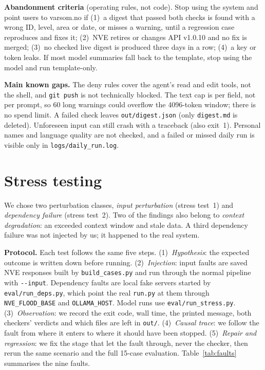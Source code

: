 \documentclass{article}
\newcommand{\code}[1]{\texttt{#1}}
\begin{document}
\textbf{Abandonment criteria} (operating rules, not code). Stop using the system and point users to varsom.no if (1)~a digest that passed both checks is found with a wrong ID, level, area or date, or misses a warning, until a regression case reproduces and fixes it; (2)~NVE retires or changes API v1.0.10 and no fix is merged; (3)~no checked live digest is produced three days in a row; (4)~a key or token leaks. If most model summaries fall back to the template, stop using the model and run template-only.

\textbf{Main known gaps.} The deny rules cover the agent's read and edit tools, not the shell, and \code{git push} is not technically blocked. The text cap is per field, not per prompt, so 60 long warnings could overflow the 4096-token window; there is no spend limit. A failed check leaves \code{out/digest.json} (only \code{digest.md} is deleted). Unforeseen input can still crash with a traceback (also exit~1). Personal names and language quality are not checked, and a failed or missed daily run is visible only in \code{logs/daily\_run.log}.

\section{Stress testing}
\label{sec:stress}
We chose two perturbation classes, \emph{input perturbation} (stress test~1) and \emph{dependency failure} (stress test~2). Two of the findings also belong to \emph{context degradation}: an exceeded context window and stale data. A third dependency failure was not injected by us; it happened to the real system.

\textbf{Protocol.} Each test follows the same five steps. (1)~\emph{Hypothesis}: the expected outcome is written down before running. (2)~\emph{Injection}: input faults are saved NVE responses built by \code{build\_cases.py} and run through the normal pipeline with \code{-{}-input}. Dependency faults are local fake servers started by \code{eval/run\_deps.py}, which point the real \code{run.py} at them through \code{NVE\_FLOOD\_BASE} and \code{OLLAMA\_HOST}. Model runs use \code{eval/run\_stress.py}. (3)~\emph{Observation}: we record the exit code, wall time, the printed message, both checkers' verdicts and which files are left in \code{out/}. (4)~\emph{Causal trace}: we follow the fault from where it enters to where it should have been stopped. (5)~\emph{Repair and regression}: we fix the stage that let the fault through, never the checker, then rerun the same scenario and the full 15-case evaluation. Table~\ref{tab:faults} summarises the nine faults.
\end{document}
